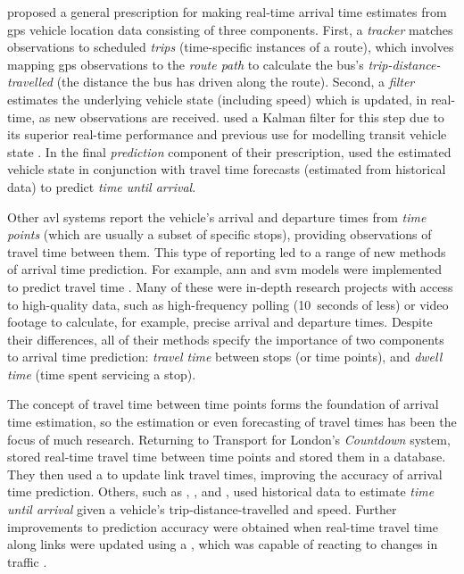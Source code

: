 \citet{Cathey_2003} proposed a general prescription for making real-time arrival time estimates from \gls{gps} vehicle location data consisting of three components. First, a \emph{tracker} matches observations to scheduled \emph{trips} (time-specific instances of a route), which involves mapping \gls{gps} observations to the \emph{route path} to calculate the bus's \emph{trip-distance-travelled} (the distance the bus has driven along the route). Second, a \emph{filter} estimates the underlying vehicle state (including speed) which is updated, in real-time, as new observations are received.  used a Kalman filter for this step due to its superior real-time performance and previous use for modelling transit vehicle state \citep{Wall_1999,Dailey_2001}. In the final \emph{prediction} component of their prescription, \citeauthor{Cathey_2003} used the estimated vehicle state in conjunction with travel time forecasts (estimated from historical data) to predict \emph{time until arrival}.


Other \gls{avl} systems report the vehicle's arrival and departure times from \emph{time points} (which are usually a subset of specific stops), providing observations of travel time between them. This type of reporting led to a range of new methods of arrival time prediction. For example, \gls{ann} and \gls{svm} models were implemented to predict travel time \citep{Jeong_2005,Shalaby_2004,Yu_2011,Cats_2015,Cats_2016,Yin_2017}. Many of these were in-depth research projects with access to high-quality data, such as high-frequency polling (10~seconds of less) or video footage to calculate, for example, precise arrival and departure times. Despite their differences, all of their methods specify the importance of two components to arrival time prediction: \emph{travel time} between stops (or time points), and \emph{dwell time} (time spent servicing a stop).


The concept of travel time between time points forms the foundation of arrival time estimation, so the estimation or even forecasting of travel times has been the focus of much research. Returning to Transport for London's \emph{Countdown} system, \citet{Reinhoudt_1997} stored real-time travel time between time points and stored them in a database. They then used a \kf{} to update link travel times, improving the accuracy of arrival time prediction. Others, such as \citet{Wall_1999}, \citet{Dailey_2001}, and \citet{Cathey_2003}, used historical data to estimate \emph{time until arrival} given a vehicle's trip-distance-travelled and speed. Further improvements to prediction accuracy were obtained when real-time travel time along links were updated using a \kf{}, which was capable of reacting to changes in traffic \citep{Shalaby_2004}.


